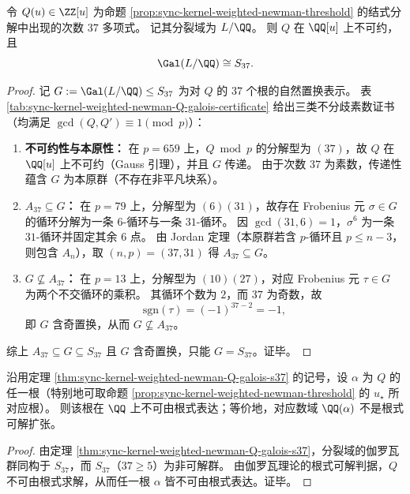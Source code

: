 \begin{theorem}\label{thm:sync-kernel-weighted-newman-Q-galois-s37}
令 \(Q(u)\in\ZZ[u]\) 为命题 \ref{prop:sync-kernel-weighted-newman-threshold} 的结式分解中出现的次数 \(37\) 多项式。
记其分裂域为 \(L/\QQ\)。
则 \(Q\) 在 \(\QQ[u]\) 上不可约，且
\[
\Gal(L/\QQ)\cong S_{37}.
\]
\end{theorem}
\begin{proof}
记 \(G:=\Gal(L/\QQ)\le S_{37}\) 为对 \(Q\) 的 \(37\) 个根的自然置换表示。
表 \ref{tab:sync-kernel-weighted-newman-Q-galois-certificate} 给出三类不分歧素数证书（均满足 \(\gcd(Q,Q')\equiv 1\pmod p\)）：
\begin{enumerate}
\normalfont
  \item \textbf{不可约性与本原性：}
  在 \(p=659\) 上，\(Q\bmod p\) 的分解型为 \((37)\)，故 \(Q\) 在 \(\QQ[u]\) 上不可约（Gauss 引理），并且 \(G\) 传递。
  由于次数 \(37\) 为素数，传递性蕴含 \(G\) 为本原群（不存在非平凡块系）。
\item \textbf{\(A_{37}\subseteq G\)：}
  在 \(p=79\) 上，分解型为 \((6)(31)\)，故存在 Frobenius 元 \(\sigma\in G\) 的循环分解为一条 \(6\)-循环与一条 \(31\)-循环。
  因 \(\gcd(31,6)=1\)，\(\sigma^{6}\) 为一条 \(31\)-循环并固定其余 \(6\) 点。
  由 Jordan 定理（本原群若含 \(p\)-循环且 \(p\le n-3\)，则包含 \(A_n\)），取 \((n,p)=(37,31)\) 得 \(A_{37}\subseteq G\)。
\item \textbf{\(G\nsubseteq A_{37}\)：}
  在 \(p=13\) 上，分解型为 \((10)(27)\)，对应 Frobenius 元 \(\tau\in G\) 为两个不交循环的乘积。
  其循环个数为 \(2\)，而 \(37\) 为奇数，故
  \[
  \mathrm{sgn}(\tau)=(-1)^{37-2}=-1,
  \]
  即 \(G\) 含奇置换，从而 \(G\nsubseteq A_{37}\)。
\end{enumerate}
综上 \(A_{37}\subseteq G\subseteq S_{37}\) 且 \(G\) 含奇置换，只能 \(G=S_{37}\)。证毕。
\end{proof}

\begin{corollary}\label{cor:sync-kernel-weighted-newman-Q-not-solvable-by-radicals}
沿用定理 \ref{thm:sync-kernel-weighted-newman-Q-galois-s37} 的记号，设 \(\alpha\) 为 \(Q\) 的任一根（特别地可取命题 \ref{prop:sync-kernel-weighted-newman-threshold} 的 \(u_\star\) 所对应根）。
则该根在 \(\QQ\) 上不可由根式表达；等价地，对应数域 \(\QQ(\alpha)\) 不是根式可解扩张。
\end{corollary}
\begin{proof}
由定理 \ref{thm:sync-kernel-weighted-newman-Q-galois-s37}，分裂域的伽罗瓦群同构于 \(S_{37}\)，而 \(S_{37}\)（\(37\ge 5\)）为非可解群。
由伽罗瓦理论的根式可解判据，\(Q\) 不可由根式求解，从而任一根 \(\alpha\) 皆不可由根式表达。证毕。
\end{proof}

